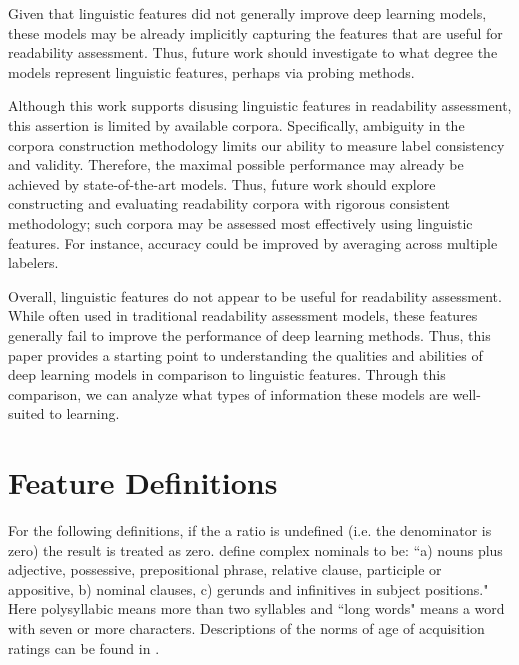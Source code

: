\documentclass[11pt,a4paper]{article}
\theoremstyle{definition}
\begin{document}
Given that linguistic features did not generally improve deep learning models, these models may be already implicitly capturing the features that are useful for readability assessment. Thus, future work should investigate to what degree the models represent linguistic features, perhaps via probing methods.

Although this work supports disusing linguistic features in readability assessment, this assertion is limited by available corpora. Specifically, ambiguity in the corpora construction methodology limits our ability to measure label consistency and validity. Therefore, the maximal possible performance may already be achieved by state-of-the-art models. Thus, future work should explore constructing and evaluating readability corpora with rigorous consistent methodology; such corpora may be assessed most effectively using linguistic features. For instance, accuracy could be improved by averaging across multiple labelers.

Overall, linguistic features do not appear to be useful for readability assessment. While often used in traditional readability assessment models, these features generally fail to improve the performance of deep learning methods. Thus, this paper provides a starting point to understanding the qualities and abilities of deep learning models in comparison to linguistic features. Through this comparison, we can analyze what types of information these models are well-suited to learning. 



\onecolumn
\appendix
\section{Feature Definitions}
\label{app:appendixFeatures}

For the following definitions, if the a ratio is undefined (i.e. the denominator is zero) the result is treated as zero. \citet{vajjalaImprovingAccuracyReadability2012} define complex nominals to be: ``a) nouns plus adjective, possessive, prepositional phrase, relative clause, participle or appositive, b) nominal clauses, c) gerunds and infinitives in subject positions." Here polysyllabic means more than two syllables and ``long words" means a word with seven or more characters. Descriptions of the norms of age of acquisition ratings can be found in \citet{kupermanAgeofacquisitionRatings302012}.
\end{document}
